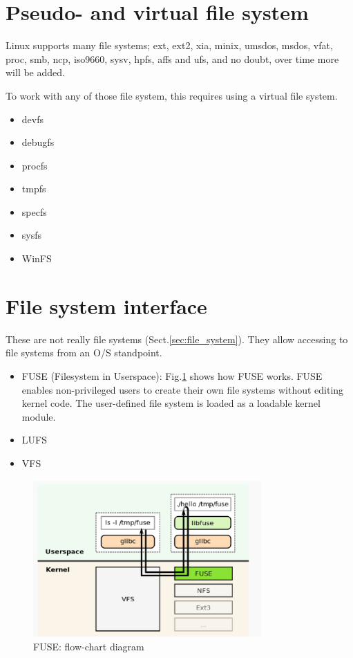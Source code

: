 \section{Pseudo- and virtual file system}
\label{sec:filesystem-virtual}
\label{sec:filesystem-pseudo}

Linux supports many file systems; ext, ext2, xia, minix, umsdos, msdos, vfat,
proc, smb, ncp, iso9660, sysv, hpfs, affs and ufs, and no doubt, over time more
will be added. 

To work with any of those file system, this requires using a virtual file
system.
\begin{itemize}
  \item devfs
  \item debugfs
  \item procfs
  \item tmpfs
  \item specfs
  \item sysfs
  \item WinFS
\end{itemize}



\section{File system interface}
\label{sec:filesystem-interface}

These are not really file systems (Sect.\ref{sec:file_system}). They allow
accessing to file systems from an O/S standpoint.

\begin{itemize}
  \item FUSE (Filesystem in Userspace): Fig.\ref{fig:FUSE} shows how FUSE
  works. FUSE enables non-privileged users to create their own file systems
  without editing kernel code. The user-defined file system is loaded as a
  loadable kernel module. 
  
  \item LUFS

  \item VFS
\end{itemize}

\begin{figure}[hbt]
  \centerline{\includegraphics[height=6cm,
    angle=0]{./images/FUSE.eps}}
\caption{FUSE: flow-chart diagram}
\label{fig:FUSE}
\end{figure}

